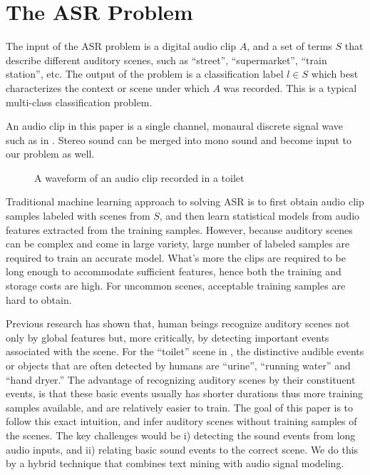 \section{The ASR Problem}
\label{sec:problem}

%
The input of the ASR problem is a digital audio clip $A$, and a set of terms $S$
that describe different auditory scenes, such as ``street'', ``supermarket'',
``train station'', etc. The output of the problem is a classification
label $l \in S$ which best characterizes the context or scene
under which $A$ was recorded. This is a typical multi-class classification
problem.

An audio clip in this paper is a single channel, monaural discrete signal
wave such as in . Stereo sound can be merged into mono sound and
become input to our problem as well.

\begin{figure}[th]
\centering
{}
\caption{A waveform of an audio clip recorded in a toilet}
\label{fig:exa}
\end{figure}

Traditional machine learning approach to solving ASR is to first
obtain audio clip samples labeled with scenes from $S$,
and then learn statistical models from audio features extracted from
the training samples. However, because auditory scenes can be complex and
come in large variety, large number of labeled samples are required to train
an accurate model. What's more the clips are required to be long enough to
accommodate sufficient features, hence both the training and storage costs
are high. For uncommon scenes, acceptable training samples are hard to obtain.

Previous research has shown that, human beings recognize auditory scenes
not only by global features but, more critically, by detecting
important events associated with the scene. For the ``toilet'' scene
in , the distinctive audible events or objects that are
often detected by humans are ``urine'', ``running water'' and ``hand dryer.''
The advantage of recognizing auditory scenes by their constituent events,
is that these basic events usually has shorter durations thus more
training samples available, and are relatively easier to train.
The goal of this paper is to
follow this exact intuition, and infer auditory scenes
without training samples of the scenes. The key challenges would be i)
detecting the sound events from long audio inputs, and ii) relating basic
sound events to the correct scene. We do this by a hybrid technique that
combines text mining with audio signal modeling.


